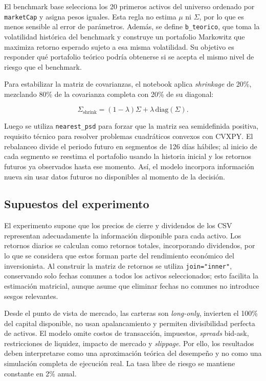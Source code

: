 El benchmark base selecciona los 20 primeros activos del universo ordenado por
\texttt{marketCap} y asigna pesos iguales. Esta regla no estima $\mu$ ni
$\Sigma$, por lo que es menos sensible al error de par\'ametros. Adem\'as, se
define \texttt{b\_teorico}, que toma la volatilidad hist\'orica del benchmark y
construye un portafolio Markowitz que maximiza retorno esperado sujeto a esa
misma volatilidad. Su objetivo es responder qu\'e portafolio te\'orico podr\'ia
obtenerse si se acepta el mismo nivel de riesgo que el benchmark.

Para estabilizar la matriz de covarianzas, el notebook aplica \textit{shrinkage}
de 20\%, mezclando 80\% de la covarianza completa con 20\% de su diagonal:

\begin{equation}
\Sigma_{\text{shrink}} = (1-\lambda)\Sigma + \lambda \, \text{diag}(\Sigma).
\end{equation}

Luego se utiliza \texttt{nearest\_psd} para forzar que la matriz sea
semidefinida positiva, requisito t\'ecnico para resolver problemas cuadr\'aticos
convexos con CVXPY. El rebalanceo divide el periodo futuro en segmentos de
126 d\'ias h\'abiles; al inicio de cada segmento se reestima el portafolio usando
la historia inicial y los retornos futuros ya observados hasta ese momento.
As\'i, el modelo incorpora informaci\'on nueva sin usar datos futuros no
disponibles al momento de la decisi\'on.

\subsection*{Supuestos del experimento}

El experimento supone que los precios de cierre y dividendos de los CSV
representan adecuadamente la informaci\'on disponible para cada activo. Los
retornos diarios se calculan como retornos totales, incorporando dividendos, por
lo que se considera que estos forman parte del rendimiento econ\'omico del
inversionista. Al construir la matriz de retornos se utiliza
\texttt{join="inner"}, conservando solo fechas comunes a todos los activos
seleccionados; esto facilita la estimaci\'on matricial, aunque asume que eliminar
fechas no comunes no introduce sesgos relevantes.

Desde el punto de vista de mercado, las carteras son \textit{long-only},
invierten el 100\% del capital disponible, no usan apalancamiento y permiten
divisibilidad perfecta de activos. El modelo omite costos de transacci\'on,
impuestos, \textit{spreads} bid-ask, restricciones de liquidez, impacto de
mercado y \textit{slippage}. Por ello, los resultados deben interpretarse como
una aproximaci\'on te\'orica del desempe\~no y no como una simulaci\'on completa de
ejecuci\'on real. La tasa libre de riesgo se mantiene constante en 2\% anual.

